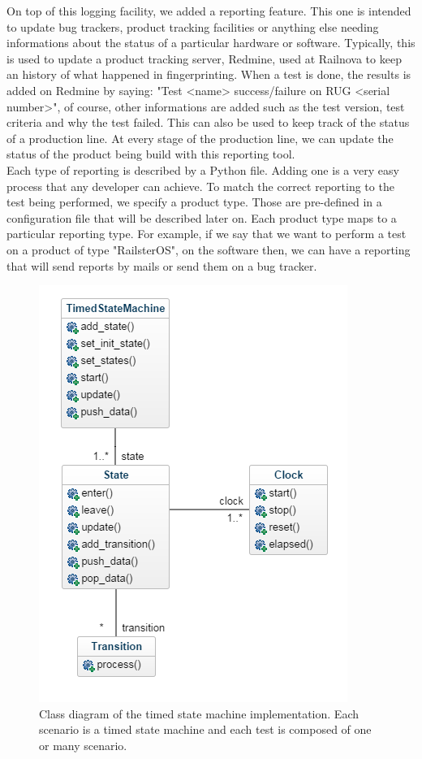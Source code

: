 \documentclass[12pt]{article}
\theoremstyle{definition}
\theoremstyle{definition}
\theoremstyle{remark}
\begin{document}
On top of this logging facility, we added a reporting feature. This one is intended to update bug trackers, product tracking facilities or anything else needing informations about the status of a particular hardware or software. Typically, this is used to update a product tracking server, Redmine, used at Railnova to keep an history of what happened in fingerprinting. When a test is done, the results is added on Redmine by saying: "Test <name> success/failure on RUG <serial number>", of course, other informations are added such as the test version, test criteria and why the test failed. This can also be used to keep track of the status of a production line. At every stage of the production line, we can update the status of the product being build with this reporting tool.\\

Each type of reporting is described by a Python file. Adding one is a very easy process that any developer can achieve. To match the correct reporting to the test being performed, we specify a product type. Those are pre-defined in a configuration file that will be described later on. Each product type maps to a particular reporting type. For example, if we say that we want to perform a test on a product of type "RailsterOS", on the software then, we can have a reporting that will send reports by mails or send them on a bug tracker.\\

\begin{figure}
    \centering
    \includegraphics[scale=0.8]{class_diagram.png}
    \caption{Class diagram of the timed state machine implementation. Each scenario is a timed state machine and each test is composed of one or many scenario.}
    \label{class_diagram}
\end{figure}
\end{document}
